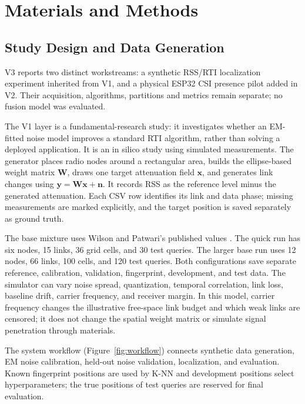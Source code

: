 \documentclass[sensors,article,submit,oneauthor]{Definitions/mdpi}
\begin{document}
\section{Materials and Methods}

\subsection{Study Design and Data Generation}

V3 reports two distinct workstreams: a synthetic RSS/RTI localization experiment inherited from V1, and a physical ESP32 CSI presence pilot added in V2. Their acquisition, algorithms, partitions and metrics remain separate; no fusion model was evaluated.

The V1 layer is a fundamental-research study: it investigates whether an EM-fitted noise model improves a standard RTI algorithm, rather than solving a deployed application. It is an in silico study using simulated measurements. The generator places radio nodes around a rectangular area, builds the ellipse-based weight matrix $\mathbf{W}$, draws one target attenuation field $\mathbf{x}$, and generates link changes using $\mathbf{y}=\mathbf{W}\mathbf{x}+\mathbf{n}$. It records RSS as the reference level minus the generated attenuation. Each CSV row identifies its link and data phase; missing measurements are marked explicitly, and the target position is saved separately as ground truth.

The base mixture uses Wilson and Patwari's published values \cite{Wilson2010}. The quick run has six nodes, 15 links, 36 grid cells, and 30 test queries. The larger base run uses 12 nodes, 66 links, 100 cells, and 120 test queries. Both configurations save separate reference, calibration, validation, fingerprint, development, and test data. The simulator can vary noise spread, quantization, temporal correlation, link loss, baseline drift, carrier frequency, and receiver margin. In this model, carrier frequency changes the illustrative free-space link budget and which weak links are censored; it does not change the spatial weight matrix or simulate signal penetration through materials.

The system workflow (Figure~\ref{fig:workflow}) connects synthetic data generation, EM noise calibration, held-out noise validation, localization, and evaluation. Known fingerprint positions are used by K-NN and development positions select hyperparameters; the true positions of test queries are reserved for final evaluation.
\end{document}
